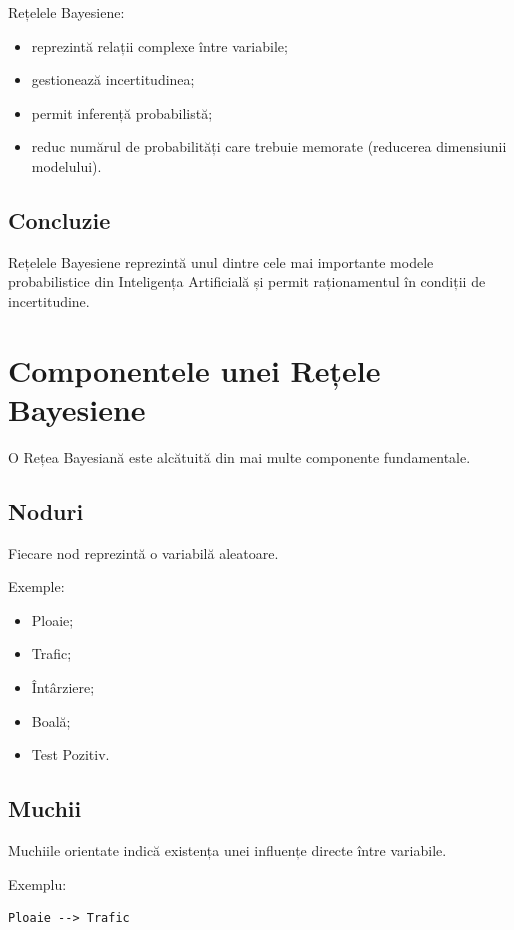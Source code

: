 \documentclass[12pt,a4paper]{article}
\begin{document}
Rețelele Bayesiene:

\begin{itemize}
\item reprezintă relații complexe între variabile;
\item gestionează incertitudinea;
\item permit inferență probabilistă;
\item reduc numărul de probabilități care trebuie memorate (reducerea dimensiunii modelului).
\end{itemize}

\subsection{Concluzie}

Rețelele Bayesiene reprezintă unul dintre cele mai importante modele probabilistice din Inteligența Artificială și permit raționamentul în condiții de incertitudine.

\section{Componentele unei Rețele Bayesiene}

O Rețea Bayesiană este alcătuită din mai multe componente fundamentale.

\subsection{Noduri}

Fiecare nod reprezintă o variabilă aleatoare.

Exemple:

\begin{itemize}
\item Ploaie;
\item Trafic;
\item Întârziere;
\item Boală;
\item Test Pozitiv.
\end{itemize}

\subsection{Muchii}

Muchiile orientate indică existența unei influențe directe între variabile.

Exemplu:

\begin{verbatim}
Ploaie --> Trafic
\end{verbatim}
\end{document}
